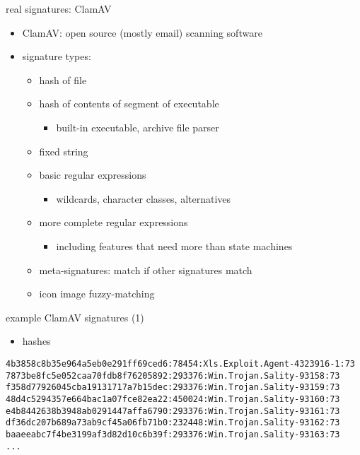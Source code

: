 
\begin{frame}{real signatures: ClamAV}
\begin{itemize}
\item ClamAV: open source (mostly email) scanning software
\item signature types:
    \begin{itemize}
    \item hash of file
    \item hash of contents of segment of executable
        \begin{itemize}
        \item built-in executable, archive file parser
        \end{itemize}
    \item fixed string
    \item basic regular expressions
        \begin{itemize}
        \item wildcards, character classes, alternatives
        \end{itemize}
    \item more complete regular expressions
        \begin{itemize}
        \item including features that need more than state machines
        \end{itemize}
    \item meta-signatures: match if other signatures match
    \item icon image fuzzy-matching
    \end{itemize}
\end{itemize}
\end{frame}

\begin{frame}[fragile,label=exampleSigsHash]{example ClamAV signatures (1)}
    \begin{itemize}
    \item hashes
    \end{itemize}
\begin{Verbatim}[fontsize=\fontsize{9}{10}]
4b3858c8b35e964a5eb0e291ff69ced6:78454:Xls.Exploit.Agent-4323916-1:73
7873be8fc5e052caa70fdb8f76205892:293376:Win.Trojan.Sality-93158:73
f358d77926045cba19131717a7b15dec:293376:Win.Trojan.Sality-93159:73
48d4c5294357e664bac1a07fce82ea22:450024:Win.Trojan.Sality-93160:73
e4b8442638b3948ab0291447affa6790:293376:Win.Trojan.Sality-93161:73
df36dc207b689a73ab9cf45a06fb71b0:232448:Win.Trojan.Sality-93162:73
baaeeabc7f4be3199af3d82d10c6b39f:293376:Win.Trojan.Sality-93163:73
...
\end{Verbatim}
\end{frame}

